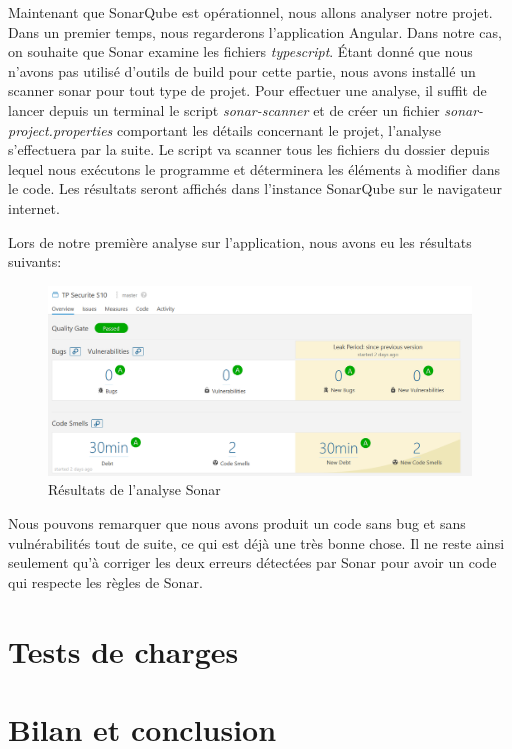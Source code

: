 \documentclass{polytech/polytech}
\begin{document}
Maintenant que SonarQube est opérationnel, nous allons analyser notre projet. Dans un premier temps, nous regarderons l'application Angular. Dans notre cas, on souhaite que Sonar examine les fichiers \textit{typescript}. \'{E}tant donné que nous n'avons pas utilisé d'outils de build pour cette partie, nous avons installé un scanner sonar pour tout type de projet. Pour effectuer une analyse, il suffit de lancer depuis un terminal le script \textit{sonar-scanner} et de créer un fichier \textit{sonar-project.properties} comportant les détails concernant le projet, l'analyse s'effectuera par la suite. Le script va scanner tous les fichiers du dossier depuis lequel nous exécutons le programme et déterminera les éléments à modifier dans le code. Les résultats seront affichés dans l'instance SonarQube sur le navigateur internet.


Lors de notre première analyse sur l'application, nous avons eu les résultats suivants: 

\begin{figure}
	\includegraphics[scale=0.55]{sonarresult.png}
	\caption{Résultats de l'analyse Sonar}
	\label{fig:sonarresult}
\end{figure}

Nous pouvons remarquer que nous avons produit un code sans bug et sans vulnérabilités tout de suite, ce qui est déjà une très bonne chose. Il ne reste ainsi seulement qu'à corriger les deux erreurs détectées par Sonar pour avoir un code qui respecte les règles de Sonar. 


\chapter{Tests de charges}



\chapter*{Bilan et conclusion}
\end{document}
